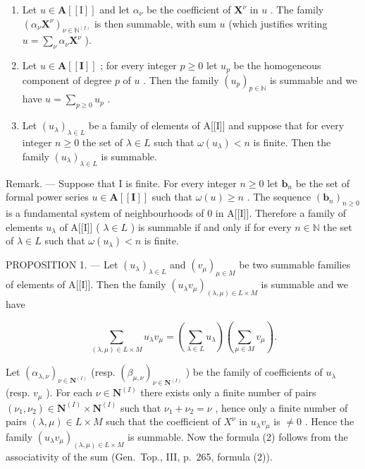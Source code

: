 \begin{enumerate}
\def\labelenumi{\alph{enumi})}
\item
  Let \(u \in \mathbf{A}[[\mathrm{I}]]\) and let \(\alpha_{\nu}\) be the coefficient of \(\mathbf{X}^{\nu}\) in \(u\) . The family \((\alpha_{\nu}\mathbf{X}^{\nu})_{\nu \in \mathbb{N}^{(I)}}\) is then summable, with sum \(u\) (which justifies writing \(u = \sum_{\nu} \alpha_{\nu}\mathbf{X}^{\nu}\) ).
\item
  Let \(u \in \mathbf{A}[[\mathbf{I}]]\) ; for every integer \(p \geqslant 0\) let \(u_p\) be the homogeneous component of degree \(p\) of \(u\) . Then the family \((u_p)_{p \in \mathbb{N}}\) is summable and we have \(u = \sum_{p \geqslant 0} u_p\) .
\item
  Let \((u_{\lambda})_{\lambda \in L}\) be a family of elements of A{[}{[}I{]}{]} and suppose that for every integer \(n \geqslant 0\) the set of \(\lambda \in L\) such that \(\omega(u_{\lambda}) < n\) is finite. Then the family \((u_{\lambda})_{\lambda \in L}\) is summable.
\end{enumerate}

Remark. --- Suppose that I is finite. For every integer \(n \geqslant 0\) let \(\mathbf{b}_n\) be the set of formal power series \(u \in \mathbf{A}[[\mathbf{I}]]\) such that \(\omega(u) \geqslant n\) . The sequence \((\mathbf{b}_n)_{n \geqslant 0}\) is a fundamental system of neighbourhoods of 0 in A{[}{[}I{]}{]}. Therefore a family of elements \(u_{\lambda}\) of A{[}{[}I{]}{]} ( \(\lambda \in L\) ) is summable if and only if for every \(n \in \mathbb{N}\) the set of \(\lambda \in L\) such that \(\omega(u_{\lambda}) < n\) is finite.

PROPOSITION 1. --- Let \((u_{\lambda})_{\lambda \in L}\) and \((v_{\mu})_{\mu \in M}\) be two summable families of elements of A{[}{[}I{]}{]}. Then the family \((u_{\lambda}v_{\mu})_{(\lambda, \mu) \in L \times M}\) is summable and we have

\[
\sum_ {(\lambda , \mu) \in L \times M} u _ {\lambda} v _ {\mu} = \left(\sum_ {\lambda \in L} u _ {\lambda}\right) \left(\sum_ {\mu \in M} v _ {\mu}\right).\tag{2}
\]

Let \((\alpha_{\lambda, \nu})_{\nu \in \mathbf{N}^{(I)}}\) (resp. \((\beta_{\mu, \nu})_{\nu \in \mathbf{N}^{(I)}}\) ) be the family of coefficients of \(u_{\lambda}\) (resp. \(v_{\mu}\) ). For each \(\nu \in \mathbf{N}^{(I)}\) there exists only a finite number of pairs \((\nu_1, \nu_2) \in \mathbf{N}^{(I)} \times \mathbf{N}^{(I)}\) such that \(\nu_1 + \nu_2 = \nu\) , hence only a finite number of pairs \((\lambda, \mu) \in L \times M\) such that the coefficient of \(X^{\nu}\) in \(u_{\lambda}v_{\mu}\) is \(\neq 0\) . Hence the family \((u_{\lambda}v_{\mu})_{(\lambda, \mu) \in L \times M}\) is summable. Now the formula (2) follows from the associativity of the sum (Gen.~Top., III, p.~265, formula (2)).

